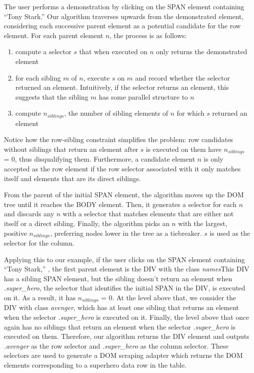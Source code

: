 \documentclass[sigconf,10pt]{acmart}
\providecommand{\tightlist}{%
  \setlength{\itemsep}{0pt}\setlength{\parskip}{0pt}}
\begin{document}
The user performs a demonstration by clicking on the SPAN element
containing ``Tony Stark.'' Our algorithm traverses upwards from the
demonstrated element, considering each successive parent element as a
potential candidate for the row element. For each parent element \(n\),
the process is as follows:

\begin{enumerate}
\def\labelenumi{\arabic{enumi}.}
\tightlist
\item
  compute a selector \(s\) that when executed on \(n\) only returns the
  demonstrated element
\item
  for each sibling \(m\) of \(n\), execute \(s\) on \(m\) and record
  whether the selector returned an element. Intuitively, if the selector
  returns an element, this suggests that the sibling \(m\) has some
  parallel structure to \(n\)
\item
  compute \(n_{siblings}\), the number of sibling elements of \(n\) for
  which \(s\) returned an element
\end{enumerate}

Notice how the row-sibling constraint simplifies the problem: row
candidates without siblings that return an element after \(s\) is
executed on them have \(n_{siblings}\) = 0, thus disqualifying them.
Furthermore, a candidate element \(n\) is only accepted as the row
element if the row selector associated with it only matches itself and
elements that are its direct siblings.

From the parent of the initial SPAN element, the algorithm moves up the
DOM tree until it reaches the BODY element. Then, it generates a
selector for each \(n\) and discards any \(n\) with a selector that
matches elements that are either not itself or a direct sibling.
Finally, the algorithm picks an \(n\) with the largest, positive
\(n_{siblings}\), preferring nodes lower in the tree as a tiebreaker.
\(s\) is used as the selector for the column.

Applying this to our example, if the user clicks on the SPAN element
containing ``Tony Stark,'' , the first parent element is the DIV with
the class \emph{names}This DIV has a sibling SPAN element, but the
sibling doesn't return an element when \emph{.super\_hero}, the selector
that identifies the initial SPAN in the DIV, is executed on it. As a
result, it has \(n_{siblings}\) = 0. At the level above that, we
consider the DIV with class \emph{avenger}, which has at least one
sibling that returns an element when the selector \emph{.super\_hero} is
executed on it. Finally, the level above that once again has no siblings
that return an element when the selector \emph{.super\_hero} is executed
on them. Therefore, our algorithm returns the DIV element and outputs
\emph{.avenger} as the row selector and \emph{.super\_hero} as the
column selector. These selectors are used to generate a DOM scraping
adapter which returns the DOM elements corresponding to a superhero data
row in the table.
\end{document}
